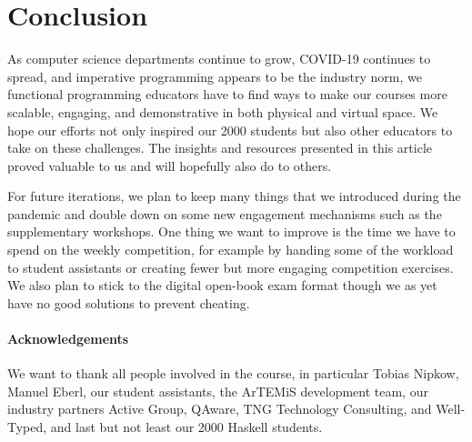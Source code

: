 \section{Conclusion}\label{sec:conclusion}

As computer science departments continue to grow,
COVID-19 continues to spread,
and imperative programming appears to be the industry norm,
we functional programming educators
have to find ways to make our courses more scalable,
engaging, and demonstrative in both physical and virtual space.
We hope our efforts not only inspired our 2000 students
but also other educators to take on these challenges.
The insights and resources presented in this article proved valuable to us and will hopefully also do to others.

For future iterations,
we plan to keep many things that we introduced during the pandemic and double down on some new engagement mechanisms such as the supplementary workshops.
One thing we want to improve is the
time we have to spend on the weekly competition,
for example by handing some of the workload to student assistants or creating fewer but more engaging competition exercises.
We also plan to stick to the digital open-book exam format
though we as yet have no good solutions to prevent cheating.

\paragraph{Acknowledgements}
We want to thank all people involved in the course,
in particular Tobias Nipkow,
Manuel Eberl,
our student assistants,
the ArTEMiS development team,
our industry partners
Active Group,
QAware,
TNG Technology Consulting,
and Well-Typed,
and last but not least our 2000 Haskell students.

